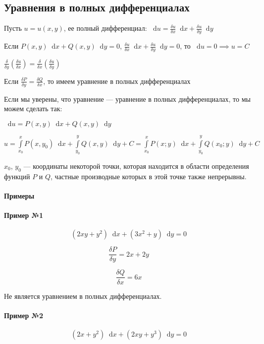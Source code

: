 \documentclass{article}
\newcommand*\diff{\mathop{}\!\mathrm{d}}
\begin{document}
\subsection{Уравнения в полных дифференциалах}

Пусть $u = u(x, y)$, ее полный дифференциал: $\diff u = \frac{\delta u}{\delta x} \diff x + \frac{\delta u}{\delta y} \diff y$

Если $P(x, y) \diff x + Q(x, y) \diff y = 0$, $\frac{\delta u}{\delta x} \diff x + \frac{\delta u}{\delta y}{\diff y} = 0$, то $\diff u = 0 \implies u = C$

$\frac{\delta}{\delta y} (\frac{\delta u}{\delta x}) = \frac{\delta}{\delta x} (\frac{\delta u}{\delta y})$

Если $\frac{\delta P}{\delta y} = \frac{\delta Q}{\delta x}$, то имеем уравнение в полных дифференциалах

Если мы уверены, что уравнение — уравнение в полных дифференциалах, то мы можем сделать так:

$\diff u = P(x, y) \diff x + Q(x, y) \diff y$

$u = \int\limits_{x_0}^{x} P(x, y_0) \diff x + \int\limits_{y_0}^{y} Q(x, y) \diff y + C = \int\limits_{x_0}^{x} P(x; y) \diff x + \int\limits_{y_0}^{y} Q(x_0; y) \diff y + C$

$x_0$, $y_0$ — координаты некоторой точки, которая находится в области определения функций $P$ и $Q$, частные производные которых в этой точке также непрерывны.

\paragraph{Примеры}

\paragraph{Пример №1}

$$(2xy + y^2) \diff x + (3x^2 + y) \diff y = 0$$

$$\frac{\delta P}{\delta y} = 2x + 2y$$

$$\frac{\delta Q}{\delta x} = 6x$$

Не является уравнением в полных дифференциалах.

\paragraph{Пример №2}

$$(2x + y^2) \diff x + (2xy + y^3) \diff y = 0$$
\end{document}
